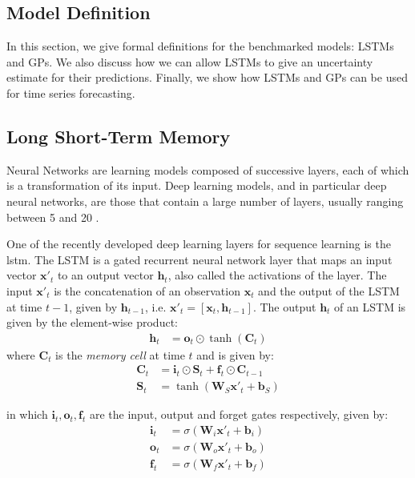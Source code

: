 \documentclass[pdftex,10pt,a4paper,journal]{article}
\theoremstyle{definition}
\theoremstyle{remark}
\newcommand*{\V}[1]{\mathbf{#1}}%
\begin{document}
\begin{multicols}{2}
\section{Model Definition}\label{sec_models}
In this section, we give formal definitions for the benchmarked models: LSTMs and GPs. We also discuss how we can allow LSTMs to give an uncertainty estimate for their predictions. Finally, we show how LSTMs and GPs can be used for time series forecasting.

\subsection{Long Short-Term Memory} \label{sub:lstm}
\par Neural Networks are learning models composed of successive layers, each of which is a transformation of its input. Deep learning models, and in particular deep neural networks, are those that contain a large number of layers, usually ranging between 5 and 20 \cite{Szegedy,Simonyan2015}. 
\par One of the recently developed deep learning layers for sequence learning is the \acrlong*{lstm}. The LSTM \cite{Gers2002,Hochreiter1997} is a gated recurrent neural network layer that maps an input vector $\V{x}'_t$ to an output vector $\V{h}_t$, also called the activations of the layer. The input $\V{x}'_t$ is the concatenation of an observation $\V{x}_t$ and the output of the LSTM at time $t-1$, given by $\V{h}_{t-1}$, i.e. $\V{x}'_t = [ \V{x}_t, \V{h}_{t-1} ]$. The output $\V{h}_t$ of an LSTM is given by the element-wise product:
\begin{align*}
    \V{h}_t &= \V{o}_t \odot \tanh(\V{C}_t)
\end{align*}
where $\V{C}_t$ is the \textit{memory cell} at time $t$ and is given by:
\begin{align*}
    \V{C}_t &= \V{i}_t\odot\V{S}_t + \V{f}_t\odot\V{C}_{t-1}\\
    \V{S}_t &= \tanh(\V{W}_S\V{x}'_t + \V{b}_S)
\end{align*}
\par in which $\V{i}_t, \V{o}_t, \V{f}_t$ are the input, output and forget gates respectively, given by:
\begin{align*}
    \V{i}_t &= \sigma(\V{W}_i\V{x}'_t + \V{b}_i)\\
    \V{o}_t &= \sigma(\V{W}_o\V{x}'_t + \V{b}_o)\\
    \V{f}_t &= \sigma(\V{W}_f\V{x}'_t + \V{b}_f)
\end{align*}

\end{multicols}
\end{document}
